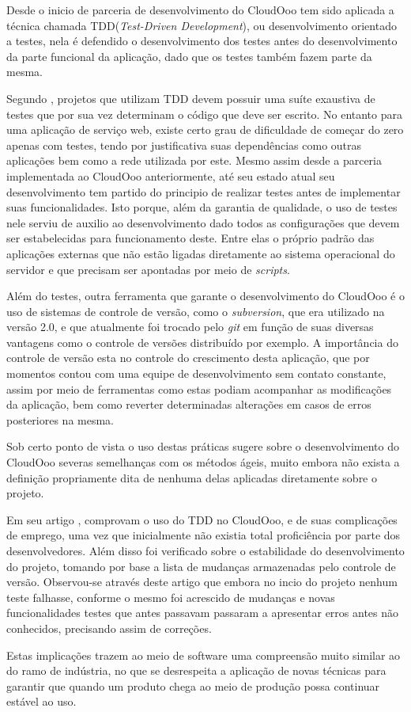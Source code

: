 Desde o inicio de parceria de desenvolvimento do CloudOoo tem sido aplicada a técnica chamada TDD(\textit{Test-Driven Development}), ou desenvolvimento orientado a testes, nela é defendido o desenvolvimento dos testes antes do desenvolvimento da parte funcional da aplicação, dado que os testes também fazem parte da mesma.

Segundo \cite{ASTELS}, projetos que utilizam TDD devem possuir uma suíte exaustiva de testes que por sua vez determinam o código que deve ser escrito. No entanto para uma aplicação de serviço web, existe certo grau de dificuldade de começar do zero apenas com testes, tendo por justificativa suas dependências como outras aplicações bem como a rede utilizada por este. Mesmo assim desde a parceria implementada ao CloudOoo anteriormente, até seu estado atual seu desenvolvimento tem partido do principio de realizar testes antes de implementar suas funcionalidades. Isto porque, além da garantia de qualidade, o uso de testes nele serviu de auxilio ao desenvolvimento dado todos as configurações que devem ser estabelecidas para funcionamento deste. Entre elas o próprio padrão das aplicações externas que não estão ligadas diretamente ao sistema operacional do servidor e que precisam ser apontadas por meio de \textit{scripts}.

Além do testes, outra ferramenta que garante o desenvolvimento do CloudOoo é o uso de sistemas de controle de versão, como o \textit{subversion}, que era utilizado na versão 2.0, e que atualmente foi trocado pelo \textit{git} em função de suas diversas vantagens como o controle de versões distribuído por exemplo. A importância do controle de versão esta no controle do crescimento desta aplicação, que por momentos contou com uma equipe de desenvolvimento sem contato constante, assim por meio de ferramentas como estas podiam acompanhar as modificações da aplicação, bem como reverter determinadas alterações em casos de erros posteriores na mesma.

Sob certo ponto de vista o uso destas práticas sugere sobre o desenvolvimento do CloudOoo severas semelhanças com os métodos ágeis, muito embora não exista a definição propriamente dita de nenhuma delas aplicadas diretamente sobre o projeto.

Em seu artigo \cite{SILVA-MONNERAT-CARVALHO}, comprovam o uso do TDD no CloudOoo, e de suas complicações de emprego, uma vez que inicialmente não existia total proficiência por parte dos desenvolvedores. Além disso foi verificado sobre o estabilidade do desenvolvimento do projeto, tomando por base a lista de mudanças armazenadas pelo controle de versão. Observou-se através deste artigo que embora no incio do projeto nenhum teste falhasse, conforme o mesmo foi acrescido de mudanças e novas funcionalidades testes que antes passavam passaram a apresentar erros antes não conhecidos, precisando assim de correções.

Estas implicações trazem ao meio de software uma compreensão muito similar ao do ramo de indústria, no que se desrespeita a aplicação de novas técnicas para garantir que quando um produto chega ao meio de produção possa continuar estável ao uso.
